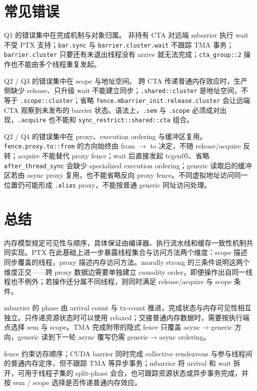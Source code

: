 \section{常见错误}

Q1 的错误集中在完成机制与对象归属。 非持有 CTA 对远端 mbarrier 执行 wait 不受 PTX 支持；\lstinline|bar.sync| 与 \lstinline|barrier.cluster.wait| 不跟踪 TMA 事务；\lstinline|barrier.cluster| 只要还有未退出线程没有 arrive 就无法完成；\lstinline|cta_group::2| 操作也不能由多个线程重复发起。

Q2 / Q3 的错误集中在 scope 与地址空间。 跨 CTA 传递普通内存效应时，生产侧缺少 release、只升级 wait 不能建立同步；\lstinline|.shared::cluster| 是地址空间，不等于 \lstinline|.scope::cluster|；省略 \lstinline|fence.mbarrier_init.release.cluster| 会让远端 CTA 观察到未发布的 barrier 状态。语法上，\lstinline|.sem| 与 \lstinline|.scope| 必须成对出现，\lstinline|.acquire| 也不能和 \lstinline|sync_restrict::shared::cta| 组合。

Q2 / Q4 的错误集中在 proxy、execution ordering 与缓冲区复用。 \lstinline|fence.proxy.to::from| 的方向始终由 from $\rightarrow$ to 决定，不随 release/acquire 反转；acquire 不能替代 proxy fence；wait 后直接发起 tcgen05、省略 \lstinline|after_thread_sync| 会缺少 specialized execution ordering；generic 读取后的缓冲区若由 async proxy 复用，也不能省略反向 proxy fence。不同虚拟地址访问同一位置仍可能形成 \lstinline|.alias| proxy，不能按普通 generic 同址访问处理。

\section{总结}

内存模型规定可见性与顺序，具体保证由编译器、执行流水线和缓存一致性机制共同实现。PTX 在此基础上进一步暴露线程集合与访问方法两个维度：scope 描述同步覆盖的线程，proxy 描述内存访问方法。morally strong 的三条件说明这两个维度正交——跨 proxy 数据边需要单独建立 causality order，即便操作出自同一线程也不例外；若操作还分属不同线程，则同时满足 release/acquire 与 scope 条件。

mbarrier 的 phase 由 arrival count 与 tx-count 推进，完成状态与内存可见性相互独立。只传递资源状态时可以使用 relaxed；交接普通内存数据时，需要按执行端点选择 sem 与 scope。TMA 完成附带的隐式 fence 只覆盖 async$\rightarrow$generic 方向，generic 读到下一轮 async 覆写仍需 generic$\rightarrow$async ordering。

fence 约束访存顺序；CUDA barrier 同时完成 collective rendezvous 与参与线程间的普通内存定序，但不跟踪 TMA 等异步事务；mbarrier 将 arrival 和 wait 拆开，可用于线程子集的 split-phase 会合，也可跟踪资源状态或异步事务完成，并按 sem / scope 选择是否传递普通内存效应。

